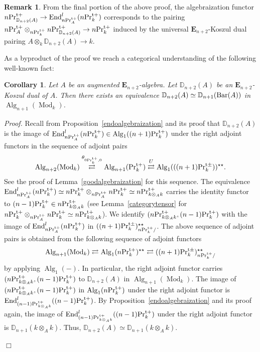 \documentclass[leqno,12pt]{amsart}
\theoremstyle{plain}
\newtheorem{Corollary}[Theorem]{Corollary}
\theoremstyle{definition}
\newtheorem{Remark}[Theorem]{Remark}
\newcommand{\DD}{\mathbb{D}}
\newcommand{\PRTT}{\textup{Pr}^{\textup{t}+}}
\newcommand{\PRTTT}{\textup{Pr}^{\textup{t}\pm}}
\newcommand{\Mod}{\operatorname{Mod}}
\newcommand{\Alg}{\operatorname{Alg}}
\newcommand{\End}{\operatorname{End}}
\newcommand{\Proof}{{\sl Proof.}\quad}
\newcommand{\QED}{{\unskip\nobreak\hfil\penalty50\quad\null\nobreak\hfil
{$\Box$}\parfillskip0pt\finalhyphendemerits0\par\medskip}}
\begin{document}
\begin{Remark}
\label{pairingalgebraization}
From the final portion of the above proof, the algebraization functor $n\PRTT_{\DD_{n+2}(A)}\to  \End_{n\PRTT_A}^l(n\PRTT_k)$
corresponds to the pairing $n\PRTT_A\otimes_{n\PRTT_k}n\PRTT_{\DD_{n+2}(A)}\to n\PRTT_k$ induced by the universal $\mathbf{E}_{n+2}$-Koszul dual pairing 
$A\otimes_k\DD_{n+2}(A)\to k$.
\end{Remark}


As a byproduct of the proof we reach a categorical understanding of the following well-known fact:

\begin{Corollary}
\label{barkoszuldual}
Let $A$ be an augmented $\mathbf{E}_{n+2}$-algebra.
Let $\DD_{n+2}(A)$ be an $\mathbf{E}_{n+2}$-Koszul dual of $A$.
Then there exists an equivalence $\DD_{n+2}(A)\simeq \DD_{n+1}(\textup{Bar}(A))$
in $\Alg_{n+1}(\Mod_k)$.
\end{Corollary}


\Proof
Recall from Proposition~\ref{endoalgebraization} and its proof
that $\DD_{n+2}(A)$ is the image of $\End_{n\PRTT_A}^l(n\PRTT_k)\in \Alg_1((n+1)\PRTT_k)$ under the right adjoint functors in the sequence of adjoint pairs
\[
\Alg_{n+2}(\Mod_k)\stackrel{\theta_{0\PRTT_k,0}}{\rightleftarrows}   \Alg_{n+1}(\PRTT_k) \stackrel{U}{\rightleftarrows} \Alg_1(((n+1)\PRTTT_k))^{\star \star}.
\]
See the proof of Lemma~\ref{goodalgebraization}
for this sequence. 
The equivalence
$\End_{n\PRTT_A}^l(n\PRTT_k)\simeq n\PRTT_k\otimes_{n\PRTT_A}n\PRTT_k\simeq n\PRTT_{k\otimes_Ak}$
carries the identity functor to $(n-1)\PRTT_k\in n\PRTT_{k\otimes_Ak}$ (see Lemma~\ref{categorytensor} for $n\PRTT_k\otimes_{n\PRTT_A}n\PRTT_k\simeq n\PRTT_{k\otimes_Ak}$).
We identify $(n\PRTT_{k\otimes_Ak}, (n-1)\PRTT_k)$ with the image of $\End_{n\PRTT_A}^l(n\PRTT_k)$ in $((n+1)\PRTTT_k)_{n\PRTT_k/}^{\star \star}$.
The above sequence of adjoint pairs is obtained from the following sequence of adjoint functors  
\[
\Alg_{n+1}(\Mod_k)\rightleftarrows   \Alg_{1}(n\PRTT_k)^{\star \star}\rightleftarrows ((n+1)\PRTTT_k)_{n\PRTT_k/}^{\star \star}
\]
by applying $\Alg_1(-)$. In particular, the right adjoint functor carries $(n\PRTT_{k\otimes_Ak}, (n-1)\PRTT_k)$ to $\DD_{n+2}(A)$ in  $\Alg_{n+1}(\Mod_k)$.
The image of $(n\PRTT_{k\otimes_Ak}, (n-1)\PRTT_k)$ in $\Alg_{1}(n\PRTT_k)$
under the right adjoint functor is $\End_{(n-1)\PRTT_{k\otimes_Ak}}^l((n-1)\PRTT_k)$.
By Proposition~\ref{endoalgebraization} and its proof again, the image of $\End_{(n-1)\PRTT_{k\otimes_Ak}}^l((n-1)\PRTT_k)$ under the right adjoint functor is $\DD_{n+1}(k\otimes_Ak)$.
Thus, $\DD_{n+2}(A)\simeq \DD_{n+1}(k\otimes_Ak)$.
\QED
\end{document}
